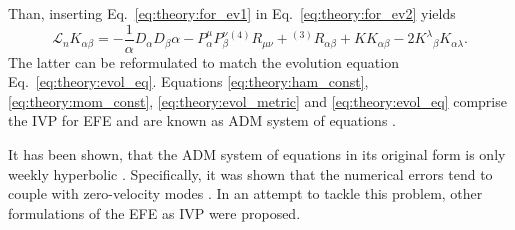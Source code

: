 %
Than, inserting Eq.~\eqref{eq:theory:for_ev1} in Eq.~\eqref{eq:theory:for_ev2} yields
%
\begin{equation}
    \mathcal{L}_n K_{\alpha\beta} = -\frac{1}{\alpha} D_{\alpha} D_{\beta} \alpha - P^{\mu}_{\alpha}P_{\beta}^{\nu} {^{(4)}R_{\mu\nu}} + {^{(3)}R_{\alpha\beta}} + KK_{\alpha\beta} - 2{K^{\lambda}}_{\beta}K_{\alpha\lambda}.
\end{equation}
%
The latter can be reformulated to match the evolution equation Eq.~\eqref{eq:theory:evol_eq}.
%
Equations \eqref{eq:theory:ham_const}, \eqref{eq:theory:mom_const}, \eqref{eq:theory:evol_metric} and 
\eqref{eq:theory:evol_eq} comprise the \ac{IVP} for \ac{EFE} and are known as \ac{ADM} 
system of equations \citep[\eg][]{Arnowitt:1962hi}.
%


It has been shown, that the \ac{ADM} system of equations in its original form 
is only weekly hyperbolic \citep{Baumgarte:2002jm}. Specifically, it was shown that the numerical 
errors tend to couple with zero-velocity modes \citep{Alcubierre:1999rt}. 
In an attempt to tackle this problem, other formulations of the \ac{EFE} as \ac{IVP} were proposed. 
%


